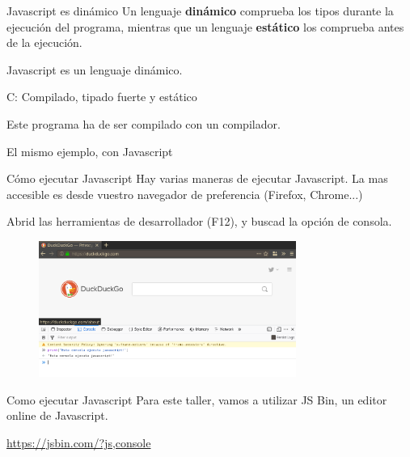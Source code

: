 \documentclass{beamer}
\begin{document}
\begin{frame}{Javascript es dinámico}
        \pause
        Un lenguaje \textbf{dinámico} comprueba los tipos durante la ejecución del programa, mientras que un lenguaje \textbf{estático} los comprueba antes de la ejecución.\pause
        \centering
        
        Javascript es un lenguaje dinámico.
\end{frame}
\begin{frame}[fragile]{C: Compilado, tipado fuerte y estático}\pause
        \centering
        
        Este programa ha de ser compilado con un compilador.
\end{frame}

\begin{frame}[fragile]{El mismo ejemplo, con Javascript}\pause
        \centering
\end{frame}

\begin{frame}{Cómo ejecutar Javascript}\pause
    Hay varias maneras de ejecutar Javascript. La mas accesible es desde vuestro navegador de preferencia (Firefox, Chrome...)\pause
    
    Abrid las herramientas de desarrollador (F12), y buscad la opción de consola.
    \begin{figure}
        \centering
        \includegraphics[width=0.75\textwidth]{images/firefox_dev.png}
    \end{figure}
\end{frame}

\begin{frame}{Como ejecutar Javascript}
Para este taller, vamos a utilizar JS Bin, un editor online de Javascript.
    
\centering\url{https://jsbin.com/?js,console}
\end{frame}
\end{document}
